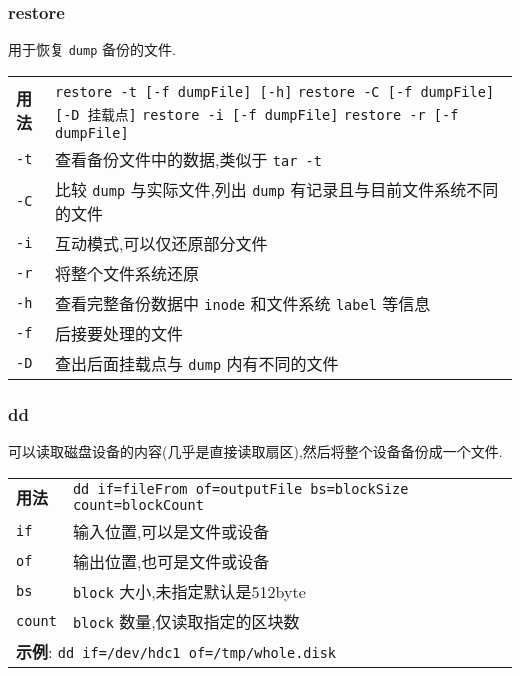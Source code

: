 \subsubsection{restore}
用于恢复 \texttt{dump} 备份的文件.
\begin{longtable}{l@{ : }p{}}\hline\hline

    \textbf{用法} & \verb"restore -t [-f dumpFile] [-h]" \newline
                    \verb"restore -C [-f dumpFile] [-D 挂载点]" \newline
                    \verb"restore -i [-f dumpFile]" \newline
                    \verb"restore -r [-f dumpFile]"
    \\

    \texttt{-t} & 查看备份文件中的数据,类似于 \texttt{tar -t}\\

    \texttt{-C} & 比较 \texttt{dump} 与实际文件,列出 \texttt{dump} 有记录且与目前文件系统不同的文件\\

    \texttt{-i} & 互动模式,可以仅还原部分文件\\

    \texttt{-r} & 将整个文件系统还原\\

    \texttt{-h} & 查看完整备份数据中 \texttt{inode} 和文件系统 \texttt{label} 等信息\\

    \texttt{-f} & 后接要处理的文件\\

    \texttt{-D} & 查出后面挂载点与 \texttt{dump} 内有不同的文件\\

    \hline
\end{longtable}

\subsubsection{dd}
可以读取磁盘设备的内容(几乎是直接读取扇区),然后将整个设备备份成一个文件.
\begin{longtable}{l@{ : }p{}}\hline\hline

    \textbf{用法} & \verb"dd if=fileFrom of=outputFile bs=blockSize count=blockCount"
    \\

    \texttt{if} & 输入位置,可以是文件或设备\\

    \texttt{of} & 输出位置,也可是文件或设备\\

    \texttt{bs} & \texttt{block} 大小,未指定默认是512byte\\

    \texttt{count} & \texttt{block} 数量,仅读取指定的区块数\\

    \multicolumn{2}{l}{ \textbf{示例}: \texttt{dd if=/dev/hdc1 of=/tmp/whole.disk}}\\

    \hline
\end{longtable}

